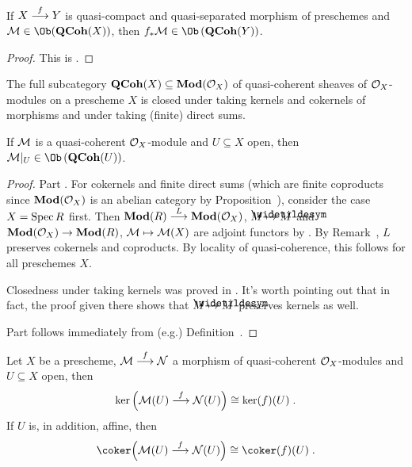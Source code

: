 \documentclass[a4paper,parskip=half,numbers=enddot, DIV=12]{scrreprt}
\begin{document}
\begin{prop}
	If $X\morphism[f]Y$ is quasi-compact and quasi-separated morphism of preschemes and $\Mm\in\Ob(\cat{QCoh}(X))$, then $f_*\Mm\in\Ob\left(\cat{QCoh}(Y)\right)$.
\end{prop}
\begin{proof}
	This is \cite[Proposition~1.5.2]{alggeo1}.
\end{proof}
\begin{prop}
	\begin{alphanumerate}
		\item {}The full subcategory $\cat{QCoh}(X)\subseteq\cat{Mod}(\Oo_X)$ of quasi-coherent sheaves of $\mathcal{O}_X$-modules on a prescheme $X$ is closed under taking kernels and cokernels of morphisms and under taking (finite) direct sums.
		\item If $\mathcal{M}$ is a quasi-coherent $\mathcal{O}_X$-module and $U\subseteq X$ open, then $\Mm|_U\in\Ob\left(\cat{QCoh}(U)\right)$.
	\end{alphanumerate}
\end{prop}
\begin{proof}
	Part . For cokernels and finite direct sums (which are finite coproducts since $\cat{Mod}(\Oo_X)$ is an abelian category by Proposition~), consider the case $X=\operatorname{Spec} R$ first. Then $\cat{Mod}(R)\morphism[L]\cat{Mod}(\Oo_X)$, $M\mapsto\snake{M}$ and $\cat{Mod}(\Oo_X)\morphism \cat{Mod}(R)$, $\mathcal{M}\mapsto\mathcal{M}(X)$ are adjoint functors by . By Remark~, $L$ preserves cokernels and coproducts. By locality of quasi-coherence, this follows for all preschemes $X$.
	
	Closedness under taking kernels was proved in \cite[Fact~1.5.3]{alggeo1}. It's worth pointing out that in fact, the proof given there shows that $M\mapsto\snake{M}$ preserves kernels as well. 
	
	Part  follows immediately from (e.g.) Definition~.
\end{proof}
\begin{cor}
	Let $X$ be a prescheme, $\Mm\morphism[f]\Nn$ a morphism of quasi-coherent $\mathcal{O}_X$-modules and $U\subseteq X$ open, then
	\begin{align*}
		\ker\Big(\Mm(U)\morphism[f]\Nn(U)\Big)\cong\ker(f)(U)\;.
	\end{align*}
	If $U$ is, in addition, affine, then
	\begin{align*}
		\coker\Big(\Mm(U)\morphism[f]\Nn(U)\Big)\cong\coker(f)(U)\;.
	\end{align*}
\end{cor}
\end{document}
